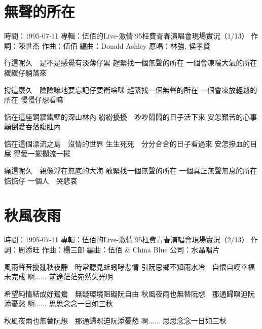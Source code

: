 \documentclass[UTF8,a4paper,oneside,twocolumn,12pt]{ctexbook}
\newcommand{\infopair}[2]{\textbullet #1：#2}
\newcommand{\zc}[1][伍佰]{\infopair{作詞}{#1}}
\newcommand{\zq}[1][伍佰]{\infopair{作曲}{#1}}
\newcommand{\bq}[1][伍佰]{\infopair{編曲}{#1}}
\newcommand{\zj}[1]{\infopair{專輯}{#1}}
\newcommand{\yc}[1]{\infopair{原唱}{#1}}
\newcommand{\sj}[1]{\infopair{時間}{#1}}
\newenvironment{info}{\begin{flushleft}\kaishu
	}
	{\end{flushleft}\normalsize\yahei\par}
\newenvironment{lyric}{
	}
{}
\begin{document}
\section{無聲的所在}
\begin{info}
	\sj{1995-07-11}
	\zj{伍佰的Live-激情'95枉費青春演唱會現場實況（1/13）}
	\zc[陳世杰]
	\zq
	\bq[Donald Ashley]
	\yc{林強, 侯孝賢}
\end{info}
\begin{lyric}
	行這呢久　是不是感覺有淡薄仔累
	趕緊找一個無聲的所在
	一個會凍喘大氣的所在
	緩緩仔躺落來

	撐這麼久　險險嘛地要忘記仔要衝啥咪
	趕緊找一個無聲的所在
	一個會凍放輕鬆的所在
	慢慢仔想看嘛

	惦在這座銅牆鐵壁的深山林內
	紛紛擾擾　吵吵鬧鬧的日子活下來
	安怎艱苦的心事　顛倒愛吞落腹肚內

	惦在這個漂流之島　沒情的世界
	生生死死　分分合合的日子看過來
	安怎摻血的目屎
	得愛一擺擱流一擺

	痛這呢久　親像浮在無底的大海
	敢緊找一個無聲的所在
	一個真正無聲無息的所在
	惦惦仔  一個人　哭悲哀
\end{lyric}

\section{秋風夜雨}
\begin{info}
	\sj{1995-07-11}
	\zj{伍佰的Live-激情'95枉費青春演唱會現場實況（2/13）}
	\zc[周添旺]
	\zq[楊三郎]
	\bq[伍佰 \& China Blue]
	\infopair{公司}{水晶唱片}
\end{info}
\begin{lyric}
	風雨聲音擾亂秋夜靜　時常聽見蚯蚓哮悲情
	引阮思鄉不知雨水冷　自恨自嘆幸福未完成
	啊......  前途茫茫宛然失光明

	希望純情結成好鴛鴦　無疑環境阻礙阮自由
	秋風夜雨也無替阮想　那通歸暝迫阮添憂愁
	啊......  思思念念一日如三秋

	秋風夜雨也無替阮想　那通歸暝迫阮添憂愁
	啊......  思思念念一日如三秋
\end{lyric}
\end{document}
